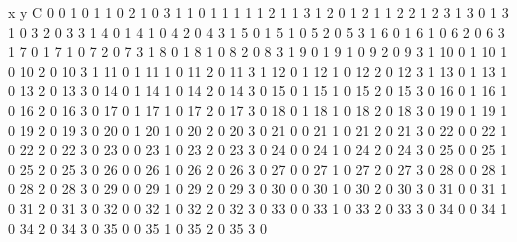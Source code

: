 x y C
0 0 1
0 1 1
0 2 1
0 3 1
1 0 1
1 1 1
1 2 1
1 3 1
2 0 1
2 1 1
2 2 1
2 3 1
3 0 1
3 1 0
3 2 0
3 3 1
4 0 1
4 1 0
4 2 0
4 3 1
5 0 1
5 1 0
5 2 0
5 3 1
6 0 1
6 1 0
6 2 0
6 3 1
7 0 1
7 1 0
7 2 0
7 3 1
8 0 1
8 1 0
8 2 0
8 3 1
9 0 1
9 1 0
9 2 0
9 3 1
10 0 1
10 1 0
10 2 0
10 3 1
11 0 1
11 1 0
11 2 0
11 3 1
12 0 1
12 1 0
12 2 0
12 3 1
13 0 1
13 1 0
13 2 0
13 3 0
14 0 1
14 1 0
14 2 0
14 3 0
15 0 1
15 1 0
15 2 0
15 3 0
16 0 1
16 1 0
16 2 0
16 3 0
17 0 1
17 1 0
17 2 0
17 3 0
18 0 1
18 1 0
18 2 0
18 3 0
19 0 1
19 1 0
19 2 0
19 3 0
20 0 1
20 1 0
20 2 0
20 3 0
21 0 0
21 1 0
21 2 0
21 3 0
22 0 0
22 1 0
22 2 0
22 3 0
23 0 0
23 1 0
23 2 0
23 3 0
24 0 0
24 1 0
24 2 0
24 3 0
25 0 0
25 1 0
25 2 0
25 3 0
26 0 0
26 1 0
26 2 0
26 3 0
27 0 0
27 1 0
27 2 0
27 3 0
28 0 0
28 1 0
28 2 0
28 3 0
29 0 0
29 1 0
29 2 0
29 3 0
30 0 0
30 1 0
30 2 0
30 3 0
31 0 0
31 1 0
31 2 0
31 3 0
32 0 0
32 1 0
32 2 0
32 3 0
33 0 0
33 1 0
33 2 0
33 3 0
34 0 0
34 1 0
34 2 0
34 3 0
35 0 0
35 1 0
35 2 0
35 3 0
